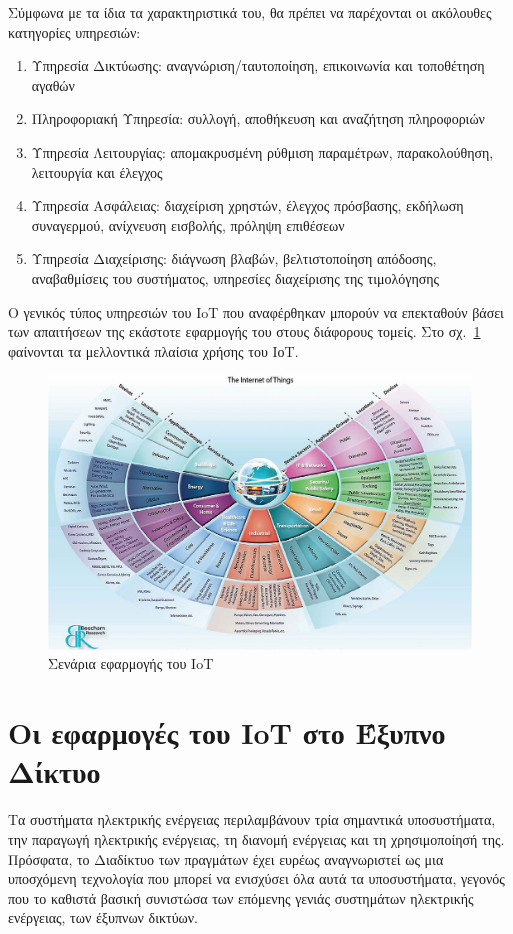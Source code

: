 \documentclass[12pt, a4paper, oneside]{report}
\begin{document}
Σύμφωνα με τα ίδια τα χαρακτηριστικά του, θα πρέπει να παρέχονται οι ακόλουθες κατηγορίες υπηρεσιών:
\begin{enumerate}
\item Υπηρεσία Δικτύωσης: αναγνώριση\slash ταυτοποίηση, επικοινωνία και τοποθέτηση αγαθών
\item Πληροφοριακή Υπηρεσία: συλλογή, αποθήκευση και αναζήτηση πληροφοριών
\item Υπηρεσία Λειτουργίας: απομακρυσμένη ρύθμιση παραμέτρων, παρακολούθηση, λειτουργία και έλεγχος
\item Υπηρεσία Ασφάλειας: διαχείριση χρηστών, έλεγχος πρόσβασης, εκδήλωση συναγερμού, ανίχνευση εισβολής, πρόληψη επιθέσεων
\item Υπηρεσία Διαχείρισης: διάγνωση βλαβών, βελτιστοποίηση απόδοσης, αναβαθμίσεις του συστήματος, υπηρεσίες διαχείρισης της τιμολόγησης
\end{enumerate}
\clearpage
Ο γενικός τύπος υπηρεσιών του IoT που αναφέρθηκαν μπορούν να επεκταθούν βάσει των απαιτήσεων της εκάστοτε εφαρμογής του στους διάφορους τομείς. Στο σχ.~\ref{eik9} φαίνονται τα μελλοντικά πλαίσια χρήσης του ΙοΤ.
\begin{figure}[!ht]
\centering
\includegraphics[width=\textwidth]{eikona_09}
\caption[Σενάρια εφαρμογής του IoT]{Σενάρια εφαρμογής του IoT\cite{cisco}}\label{eik9}
\end{figure}

\section{Οι εφαρμογές του IoT στο Έξυπνο Δίκτυο}

Τα συστήματα ηλεκτρικής ενέργειας περιλαμβάνουν τρία σημαντικά υποσυστήματα, την παραγωγή ηλεκτρικής ενέργειας, τη διανομή ενέργειας και τη χρησιμοποίησή της. Πρόσφατα, το Διαδίκτυο των πραγμάτων έχει ευρέως αναγνωριστεί ως μια υποσχόμενη τεχνολογία που μπορεί να ενισχύσει όλα αυτά τα υποσυστήματα, γεγονός που το καθιστά βασική συνιστώσα των επόμενης γενιάς συστημάτων ηλεκτρικής ενέργειας, των έξυπνων δικτύων.
\end{document}
